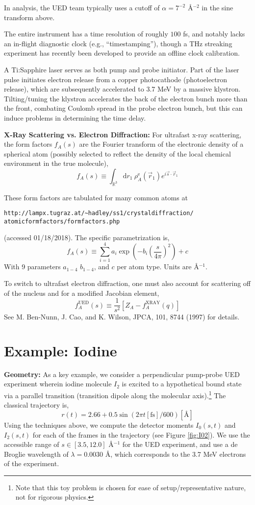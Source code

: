 \documentclass[fleqn,oneside,12pt]{article}
\begin{document}
In analysis, the UED team typically uses a cutoff of $\alpha = 7^{-2}$
\AA{}$^{-2}$ in the sine transform above. 

The entire instrument has a time resolution of roughly $100$ fs, and notably
lacks an in-flight diagnostic clock (e.g., ``timestamping''), though a THz
streaking experiment has recently been developed to provide an offline clock
calibration. 

A Ti:Sapphire laser serves as both pump and probe initiator. Part of the laser
pulse initiates electron release from a copper photocathode (photoelectron
release), which are subsequently accelerated to 3.7 MeV by a massive klystron.
Tilting/tuning the klystron accelerates the back of the electron bunch more than
the front, combating Coulomb spread in the probe electron bunch, but this can
induce problems in determining the time delay. 

\textbf{X-Ray Scattering vs. Electron Diffraction:} For ultrafast x-ray
scattering, the form factors $f_{A} (s)$ are the Fourier transform of the
electronic density of a spherical atom (possibly selected to reflect the density
of the local chemical environment in the true molecule),
\[
f_{A} (s)
\equiv
\int_{\mathbb{R}^3}
\mathrm{d} r_1
\
\rho_{A}^{\mathrm{e}} (\vec r_{1})
e^{i \vec s \cdot \vec r_1}
\]

These form factors are tabulated for many common atoms at
\begin{verbatim}
http://lampx.tugraz.at/~hadley/ss1/crystaldiffraction/
atomicformfactors/formfactors.php
\end{verbatim}
(accessed 01/18/2018). The specific parametrization is,
\[
f_{A} (s)
\equiv
\sum_{i=1}^{4}
a_{i}
\exp
\left (
-b_{i}
\left (
\frac{s}{4\pi}
\right )^2
\right )
+
c
\]
With 9 parameters $a_{1-4}$ $b_{1-4}$, and $c$ per atom type. Units are
\AA{}$^{-1}$.

To switch to ultrafast electron diffraction, one must also account for
scattering off of the nucleus and for a modified Jacobian element,
\[
f_{A}^{\mathrm{UED}}
(s)
\equiv
\frac{1}{s^2}
\left [
Z_{A}
-
f_{A}^{\mathrm{XRAY}}
(q)
\right ]
\]
See M. Ben-Nunn, J. Cao, and K. Wilson, JPCA, 101, 8744 (1997) for details.

\section{Example: Iodine}

\textbf{Geometry:} As a key example, we consider a perpendicular pump-probe UED
experiment wherein iodine molecule $I_{2}$ is excited to a hypothetical bound
state via a parallel transition (transition dipole along the molecular
axis).\footnote{Note that this toy problem is chosen for ease of
setup/representative nature, not for rigorous physics.} The classical trajectory
is,
\[
r (t)
=
2.66
+
0.5 \sin (2 \pi t [\mbox{fs}]/ 600)
[ \mbox{\AA{}} ]
\]
Using the techniques above, we compute the detector moments $I_0 (s, t)$ and
$I_2 (s, t)$ for each of the frames in the trajectory (see Figure
\ref{fig:I02}). We use the accessible range of $s \in [3.5, 12.0]$ \AA{}$^{-1}$
for the UED experiment, and use a de Broglie wavelength of $\lambda = 0.0030$
\AA{}, which corresponds to the 3.7 MeV electrons of the experiment.
\end{document}
